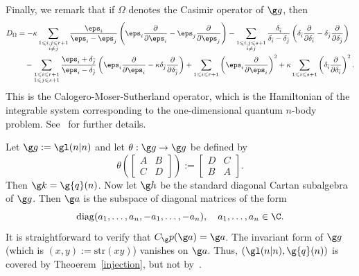 \documentclass[11pt]{amsart}
\begin{document}
\begin{rmk}
Finally, we remark that if $\Omega$ denotes  the Casimir operator of $\g g$, then  
  \begin{equation*}
\begin{split}
D_\Omega&= -\kappa \sum_{\substack{1 \leqslant i,j \leqslant r+1 \\ i \neq j}} \frac{\eps_i}{\eps_i - \eps_j}\left( \eps_i \frac{\partial}{\partial \eps_i} - \eps_j \frac{\partial}{\partial \eps_j} \right) 
- \sum_{\substack{1 \leqslant i,j \leqslant s+1 \\ i \neq j}} \frac{\delta_{\bar{i}}}{\delta_{\bar{i}} - \delta_{\bar{j}}}\left( \delta_{\bar{i}} \frac{\partial}{\partial \delta_{\bar{i}}} - \delta_{\bar{j}} \frac{\partial}{\partial \delta_{\bar{j}}} \right) \\
&\quad - \sum_{\substack{1 \leqslant i \leqslant r+1 \\ 1 \leqslant j \leqslant s+1}} \frac{\eps_i + \delta_{\bar{j}}}{\eps_i - \delta_{\bar{j}}}\left( \eps_i \frac{\partial}{\partial \eps_i}  -\kappa \delta_{\bar{j}} \frac{\partial}{\partial \delta_{\bar{j}}} \right)
+ \sum_{1 \leqslant i \leqslant r+1} \left( \eps_i \frac{\partial}{\partial \eps_i} \right)^2  
+ \kappa \sum_{1 \leqslant i \leqslant s+1} \left( \delta_{\bar{i}} \frac{\partial}{\partial \delta_{\bar{i}}} \right)^2.
\end{split}
\end{equation*}
This is the Calogero-Moser-Sutherland operator, which is the Hamiltonian of the integrable system corresponding to the one-dimensional quantum $n$-body problem. See~\cite{SergeevVeselovSym,MitraThesis} for further details.
\end{rmk} 

\begin{ex}
\label{exa-q}
Let $\g g:=\gl(n|n)$ and let $\theta:\g g\to \g g$ be defined by 
\[
\theta\left(
\begin{bmatrix}
A& B\\
C& D\end{bmatrix}\right)
:=\begin{bmatrix}
D & C \\
B & A\end{bmatrix}.
\]
Then $\g k=\g{q}(n)$. Now let $\g h$ be the standard diagonal Cartan subalgebra of $\g g$. Then $\g a$ is the subspace of diagonal matrices of the form
\[
\mathrm{diag}(a_1,\ldots,a_n,-a_1,\ldots,-a_n),\quad a_1,\ldots,a_n\in\C. 
\]
It is straightforward to verify that  $C_\g p(\g a)=\g a$.
The invariant form of $\g g$ (which is $(x,y):=\mathrm{str}(xy)$) vanishes on $\g a$. Thus, $(\gl(n|n),\g{q}(n))$ is covered by Theoerem~\ref{injection},
but not by~\cite[Theorem 4.1]{SergeevVeselovSym}. 
\end{ex}
\end{document}
